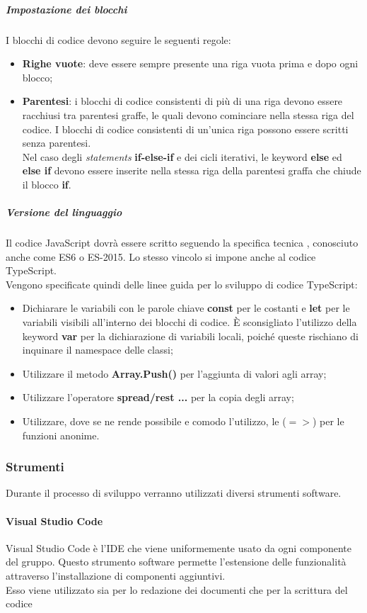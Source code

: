 \documentclass[../norme-di-progetto.tex]{subfiles}
\begin{document}
\subparagraph*{Impostazione dei blocchi}
I blocchi di codice devono seguire le seguenti regole:
\begin{itemize}
  \item \textbf{Righe vuote}: deve essere sempre presente una riga vuota prima e dopo ogni blocco;
  \item \textbf{Parentesi}: i blocchi di codice consistenti di più di una riga devono essere racchiusi tra parentesi graffe, le quali devono cominciare nella stessa riga del codice. I blocchi di codice consistenti di un'unica riga possono essere scritti senza parentesi. \\ Nel caso degli \textit{statements} \textbf{if-else-if} e dei cicli iterativi, le keyword \textbf{else} ed \textbf{else if} devono essere inserite nella stessa riga della parentesi graffa che chiude il blocco \textbf{if}.
\end{itemize}

\subparagraph{Versione del linguaggio}
Il codice JavaScript dovrà essere scritto seguendo la specifica tecnica , conosciuto anche come ES6 o ES-2015. Lo stesso vincolo si impone anche al codice TypeScript. \\
Vengono specificate quindi delle linee guida per lo sviluppo di codice TypeScript:
\begin{itemize}
  \item Dichiarare le variabili con le parole chiave \textbf{const} per le costanti e \textbf{let} per le variabili visibili all'interno dei blocchi di codice. È sconsigliato l'utilizzo della keyword \textbf{var} per la dichiarazione di variabili locali, poiché queste rischiano di inquinare il namespace delle classi;
  \item Utilizzare il metodo \textbf{Array.Push()} per l'aggiunta di valori agli array;
  \item Utilizzare l'operatore \textbf{spread/rest ...} per la copia degli array;
  \item Utilizzare, dove se ne rende possibile e comodo l'utilizzo, le  ($=>$) per le funzioni anonime.
\end{itemize}

\subsubsection{Strumenti}
Durante il processo di sviluppo verranno utilizzati diversi strumenti software.

\paragraph{Visual Studio Code}
Visual Studio Code è l'IDE che viene uniformemente usato da ogni componente del gruppo. Questo strumento software permette l'estensione delle funzionalità attraverso l'installazione di componenti aggiuntivi. \\
Esso viene utilizzato sia per lo redazione dei documenti che per la scrittura del codice
\end{document}
